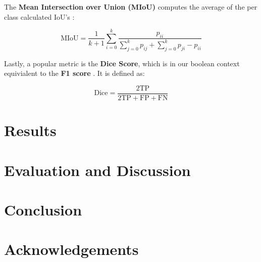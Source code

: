 \documentclass[11pt,
  paper=a4, 
  bibliography=totocnumbered,
	captions=tableheading,
	BCOR=10mm
]{scrreprt}
\theoremstyle{definition}
\newcommand{\TP}{\text{TP}}
\newcommand{\FP}{\text{FP}}
\newcommand{\FN}{\text{FN}}
\begin{document}
The \textbf{Mean Intersection over Union (MIoU)} computes the average of the per class calculated IoU's \cite{Garcia-Garcia2018}:

\begin{equation}
	\text{MIoU} = \frac{1}{k+1} \sum_{i=0}^{k} \frac{p_{ii}}{\sum_{j=0}^{k} p_{ij} + \sum_{j=0}^{k} p_{ji}-p_{ii}}
\end{equation}

Lastly, a popular metric is the \textbf{Dice Score}, which is in our boolean context equivialent to the \textbf{F1 score} \cite{Minaee2020}. It is defined as:

\begin{equation}
	\text{Dice}=\frac{2\TP}{2 \TP + \FP+ \FN}
\end{equation}

\chapter{Results}
\chapter{Evaluation and Discussion}
\chapter{Conclusion}


\chapter*{Acknowledgements}






\glsaddall
\printglossaries

\printbibliography
\end{document}
